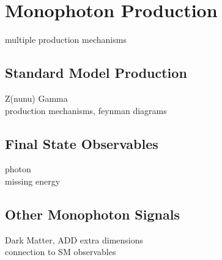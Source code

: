 
\chapter{Monophoton Production}\label{sec:lgproduction}
 multiple production mechanisms

\section{Standard Model Production}
 Z(nunu) Gamma \\
 production mechanisms, feynman diagrams 

\section{Final State Observables}
 photon \\
 missing energy

\section{Other Monophoton Signals}
 Dark Matter, ADD extra dimensions \\
 connection to SM observables
